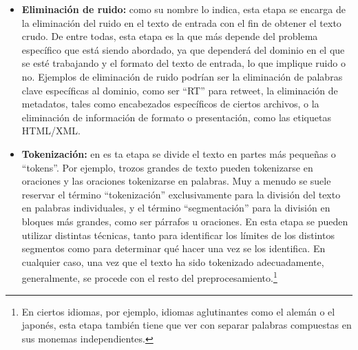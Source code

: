 \begin{itemize}
    \item\textbf{Eliminación de ruido:} como su nombre lo indica, esta etapa se encarga de la eliminación del ruido en el texto de entrada con el fin de obtener el texto crudo. De entre todas, esta etapa es la que más depende del problema específico que está siendo abordado, ya que dependerá del dominio en el que se esté trabajando y el formato del texto de entrada, lo que implique ruido o no.
    Ejemplos de eliminación de ruido podrían ser la eliminación de palabras clave específicas al dominio, como ser ``RT'' para retweet, la eliminación de metadatos, tales como encabezados específicos de ciertos archivos, o la eliminación de información de formato o presentación, como las etiquetas HTML/XML.
    
    \item\textbf{Tokenización:} en es
    ta etapa se divide el texto en partes más pequeñas o ``tokens''. Por ejemplo, trozos grandes de texto pueden tokenizarse en oraciones y las oraciones tokenizarse en palabras.
    Muy a menudo se suele reservar el término ``tokenización'' exclusivamente para la división del texto en palabras individuales, y el término ``segmentación'' para la división en bloques más grandes, como ser párrafos u oraciones.
    En esta etapa se pueden utilizar distintas técnicas, tanto para identificar los límites de los distintos segmentos como para determinar qué hacer una vez se los identifica.
    En cualquier caso, una vez que el texto ha sido tokenizado adecuadamente, generalmente, se procede con el resto del preprocesamiento.\footnote{En ciertos idiomas, por ejemplo, idiomas aglutinantes como el alemán o el japonés, esta etapa también tiene que ver con separar palabras compuestas en sus monemas independientes.}
    

\end{itemize}
